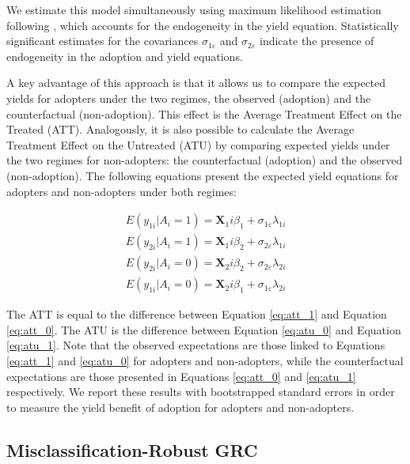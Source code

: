 \documentclass[11pt]{article}
\begin{document}
We estimate this model simultaneously using maximum likelihood estimation following \cite{lokshin2004maximum}, which accounts for the endogeneity in the yield equation.  Statistically significant estimates for the covariances $\sigma_{1\varepsilon}$ and $\sigma_{2\varepsilon}$ indicate the presence of endogeneity in the adoption and yield equations. 


A key advantage of this approach is that it allows us to compare the expected yields for adopters under the two regimes, the observed (adoption) and the counterfactual (non-adoption). This effect is the Average Treatment Effect on the Treated (ATT). Analogously, it is also possible to calculate the Average Treatment Effect on the Untreated (ATU) by comparing expected yields under the two regimes for non-adopters: the counterfactual (adoption) and the observed (non-adoption). The following equations present the expected yield equations for adopters and non-adopters under both regimes:

\begin{subequations}
\begin{align}
    E(y_{1i}|A_i=1)=\bm{X}_1i\beta_1+\sigma_{1\varepsilon} \lambda_{1i} \label{eq:att_1} \\
    E(y_{2i}|A_i=1)=\bm{X}_1i\beta_2+\sigma_{2\varepsilon} \lambda_{1i} \label{eq:att_0} \\
    E(y_{2i}|A_i=0)=\bm{X}_2i\beta_2+\sigma_{2\varepsilon} \lambda_{2i} \label{eq:atu_0} \\
    E(y_{1i}|A_i=0)=\bm{X}_2i\beta_1+\sigma_{1\varepsilon} \lambda_{2i} \label{eq:atu_1}    
\end{align}
\end{subequations}

The ATT is equal to the difference between Equation \ref{eq:att_1} and Equation \ref{eq:att_0}. The ATU is the difference between Equation \ref{eq:atu_0} and Equation \ref{eq:atu_1}. Note that the observed expectations are those linked to Equations \ref{eq:att_1} and \ref{eq:atu_0} for adopters and non-adopters, while the counterfactual expectations are those presented in Equations \ref{eq:att_0} and \ref{eq:atu_1} respectively. We report these results with bootstrapped standard errors in order to measure the yield benefit of adoption for adopters and non-adopters. 

\subsection{Misclassification-Robust GRC}
\end{document}
